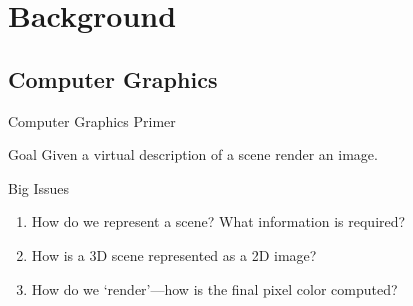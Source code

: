 \documentclass[10pt]{beamer}
\begin{document}
\section{Background}

\subsection{Computer Graphics}
\begin{frame}{Computer Graphics Primer}
  \begin{block}{Goal}
    Given a virtual description of a scene render an image.
  \end{block}

  \begin{block}{Big Issues}
    \begin{enumerate}
      \item How do we represent a scene? What information is required?  %
      \item How is a 3D scene represented as a 2D image?  %
      \item How do we `render'---how is the final pixel color computed? %
    \end{enumerate}
  \end{block}
\end{frame}
\end{document}
